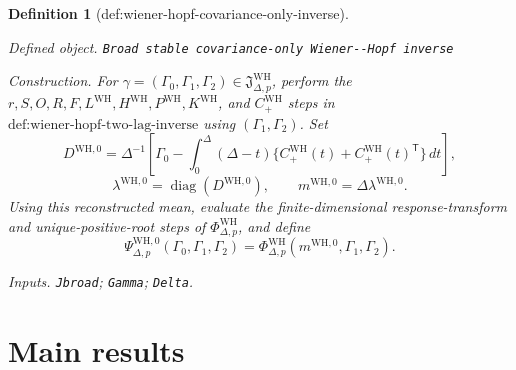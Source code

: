 \documentclass{article}
\newtheorem{definition}{Definition}
\begin{document}
\begin{definition}[def:wiener-hopf-covariance-only-inverse]\label{def:wiener-hopf-covariance-only-inverse}
\par\smallskip\noindent\emph{Defined object.} \texttt{Broad stable covariance-\allowbreak{}only Wiener-\allowbreak{}-\allowbreak{}Hopf inverse}
\par\smallskip\noindent\emph{Construction.} For \(\gamma=(\Gamma_0,\Gamma_1,\Gamma_2)\in\mathfrak J_{\Delta,p}^{\mathrm{WH}}\), perform the \(r,S,O,R,F,L^{\mathrm{WH}},H^{\mathrm{WH}},P^{\mathrm{WH}},K^{\mathrm{WH}}\), and \(C_{+}^{\mathrm{WH}}\) steps in \(\text{def:wiener-hopf-two-lag-inverse}\) using \((\Gamma_1,\Gamma_2)\).  Set
\[
 D^{\mathrm{WH},0}=\Delta^{-1}\!\left[
 \Gamma_0-\int_0^\Delta(\Delta-t)
 \{C_{+}^{\mathrm{WH}}(t)+C_{+}^{\mathrm{WH}}(t)^{\mathsf T}\}\,dt
 \right],
\]
\[
 \lambda^{\mathrm{WH},0}=\operatorname{diag}(D^{\mathrm{WH},0}),
 \qquad m^{\mathrm{WH},0}=\Delta\lambda^{\mathrm{WH},0}.
\]
Using this reconstructed mean, evaluate the finite-dimensional response-transform and unique-positive-root steps of \(\Phi_{\Delta,p}^{\mathrm{WH}}\), and define
\[
 \Psi_{\Delta,p}^{\mathrm{WH},0}(\Gamma_0,\Gamma_1,\Gamma_2)
 =\Phi_{\Delta,p}^{\mathrm{WH}}(m^{\mathrm{WH},0},\Gamma_1,\Gamma_2).
\]
\par\smallskip\noindent\emph{Inputs.} \texttt{Jbroad}; \texttt{Gamma}; \texttt{Delta}.
\end{definition}

\section{Main results}
\end{document}
